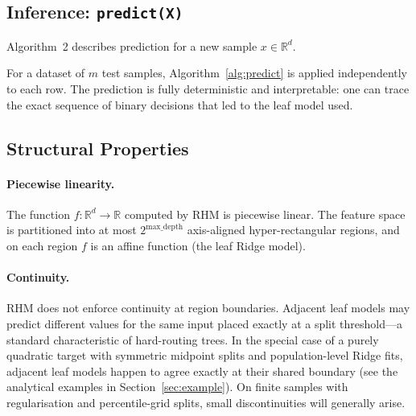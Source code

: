 \documentclass[11pt,a4paper]{article}
\begin{document}
\subsection{Inference: \texttt{predict(X)}}

Algorithm~2 describes prediction for a new sample $x \in \mathbb{R}^d$.

\medskip
\noindent{}\medskip

For a dataset of $m$ test samples, Algorithm~\ref{alg:predict} is applied independently to each row. The prediction is fully deterministic and interpretable: one can trace the exact sequence of binary decisions that led to the leaf model used.

\subsection{Structural Properties}

\paragraph{Piecewise linearity.} The function $f: \mathbb{R}^d \to \mathbb{R}$ computed by RHM is piecewise linear. The feature space is partitioned into at most $2^{\text{max\_depth}}$ axis-aligned hyper-rectangular regions, and on each region $f$ is an affine function (the leaf Ridge model).

\paragraph{Continuity.} RHM does not enforce continuity at region boundaries. Adjacent leaf models may predict different values for the same input placed exactly at a split threshold---a standard characteristic of hard-routing trees. In the special case of a purely quadratic target with symmetric midpoint splits and population-level Ridge fits, adjacent leaf models happen to agree exactly at their shared boundary (see the analytical examples in Section~\ref{sec:example}). On finite samples with regularisation and percentile-grid splits, small discontinuities will generally arise.
\end{document}
